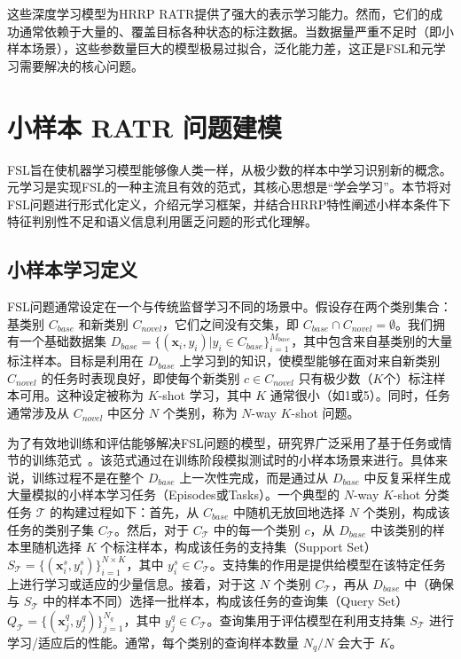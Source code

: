 这些深度学习模型为HRRP RATR提供了强大的表示学习能力。然而，它们的成功通常依赖于大量的、覆盖目标各种状态的标注数据。当数据量严重不足时（即小样本场景），这些参数量巨大的模型极易过拟合，泛化能力差，这正是FSL和元学习需要解决的核心问题。

\section{小样本 RATR 问题建模}
\label{sec:fsl_modeling}

FSL旨在使机器学习模型能够像人类一样，从极少数的样本中学习识别新的概念。元学习是实现FSL的一种主流且有效的范式，其核心思想是“学会学习”。本节将对FSL问题进行形式化定义，介绍元学习框架，并结合HRRP特性阐述小样本条件下特征判别性不足和语义信息利用匮乏问题的形式化理解。

\subsection{小样本学习定义}
\label{subsec:fsl_definition}

FSL问题通常设定在一个与传统监督学习不同的场景中。假设存在两个类别集合：基类别 $C_{base}$ 和新类别 $C_{novel}$，它们之间没有交集，即 $C_{base} \cap C_{novel} = \emptyset$。我们拥有一个基础数据集 $D_{base} = \{(\mathbf{x}_i, y_i) | y_i \in C_{base}\}_{i=1}^{M_{base}}$，其中包含来自基类别的大量标注样本。目标是利用在 $D_{base}$ 上学习到的知识，使模型能够在面对来自新类别 $C_{novel}$ 的任务时表现良好，即使每个新类别 $c \in C_{novel}$ 只有极少数（$K$个）标注样本可用。这种设定被称为 $K$-shot 学习，其中 $K$ 通常很小（如1或5）。同时，任务通常涉及从 $C_{novel}$ 中区分 $N$ 个类别，称为 $N$-way $K$-shot 问题。

为了有效地训练和评估能够解决FSL问题的模型，研究界广泛采用了基于任务或情节的训练范式~\cite{X}。该范式通过在训练阶段模拟测试时的小样本场景来进行。具体来说，训练过程不是在整个 $D_{base}$ 上一次性完成，而是通过从 $D_{base}$ 中反复采样生成大量模拟的小样本学习任务（Episodes或Tasks）。一个典型的 $N$-way $K$-shot 分类任务 $\mathcal{T}$ 的构建过程如下：首先，从 $C_{base}$ 中随机无放回地选择 $N$ 个类别，构成该任务的类别子集 $C_{\mathcal{T}}$。然后，对于 $C_{\mathcal{T}}$ 中的每一个类别 $c$，从 $D_{base}$ 中该类别的样本里随机选择 $K$ 个标注样本，构成该任务的支持集（Support Set） $S_{\mathcal{T}} = \{(\mathbf{x}_i^s, y_i^s)\}_{i=1}^{N \times K}$，其中 $y_i^s \in C_{\mathcal{T}}$。支持集的作用是提供给模型在该特定任务上进行学习或适应的少量信息。接着，对于这 $N$ 个类别 $C_{\mathcal{T}}$，再从 $D_{base}$ 中（确保与 $S_{\mathcal{T}}$ 中的样本不同）选择一批样本，构成该任务的查询集（Query Set） $Q_{\mathcal{T}} = \{(\mathbf{x}_j^q, y_j^q)\}_{j=1}^{N_q}$，其中 $y_j^q \in C_{\mathcal{T}}$。查询集用于评估模型在利用支持集 $S_{\mathcal{T}}$ 进行学习/适应后的性能。通常，每个类别的查询样本数量 $N_q/N$ 会大于 $K$。

